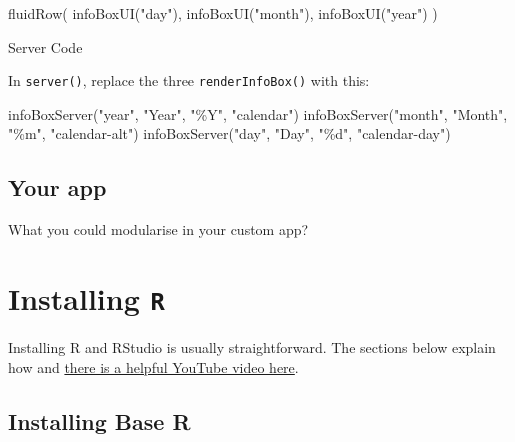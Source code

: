\documentclass[
  oneside]{book}
\newenvironment{Shaded}{\begin{snugshade}}{\end{snugshade}}
\newcommand{\FunctionTok}[1]{\textcolor[rgb]{0.00,0.00,0.00}{#1}}
\newcommand{\NormalTok}[1]{#1}
\newcommand{\StringTok}[1]{\textcolor[rgb]{0.31,0.60,0.02}{#1}}
\begin{document}
\begin{Shaded}
\begin{Highlighting}[]
\FunctionTok{fluidRow}\NormalTok{(}
    \FunctionTok{infoBoxUI}\NormalTok{(}\StringTok{"day"}\NormalTok{),}
    \FunctionTok{infoBoxUI}\NormalTok{(}\StringTok{"month"}\NormalTok{),}
    \FunctionTok{infoBoxUI}\NormalTok{(}\StringTok{"year"}\NormalTok{)}
\NormalTok{)}
\end{Highlighting}
\end{Shaded}

Server Code

In \texttt{server}\texttt{()}, replace the three \texttt{renderInfoBox}\texttt{()} with this:

\begin{Shaded}
\begin{Highlighting}[]
\FunctionTok{infoBoxServer}\NormalTok{(}\StringTok{"year"}\NormalTok{, }\StringTok{"Year"}\NormalTok{, }\StringTok{"\%Y"}\NormalTok{, }\StringTok{"calendar"}\NormalTok{)}
\FunctionTok{infoBoxServer}\NormalTok{(}\StringTok{"month"}\NormalTok{, }\StringTok{"Month"}\NormalTok{, }\StringTok{"\%m"}\NormalTok{, }\StringTok{"calendar{-}alt"}\NormalTok{)}
\FunctionTok{infoBoxServer}\NormalTok{(}\StringTok{"day"}\NormalTok{, }\StringTok{"Day"}\NormalTok{, }\StringTok{"\%d"}\NormalTok{, }\StringTok{"calendar{-}day"}\NormalTok{)}
\end{Highlighting}
\end{Shaded}

\hypertarget{your-app-modules}{%
\section{Your app}\label{your-app-modules}}

What you could modularise in your custom app?

\hypertarget{appendix-appendices}{%
\appendix}


\hypertarget{installing-r}{%
\chapter{\texorpdfstring{Installing \texttt{R}}{Installing R}}\label{installing-r}}

Installing R and RStudio is usually straightforward. The sections below explain how and \href{https://www.youtube.com/watch?v=lVKMsaWju8w}{there is a helpful YouTube video here}.

\hypertarget{installing-base-r}{%
\section{Installing Base R}\label{installing-base-r}}
\end{document}
